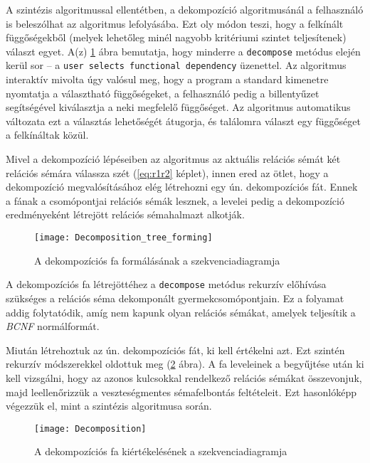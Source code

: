 A szintézis algoritmussal ellentétben, a dekompozíció algoritmusánál a felhasználó is beleszólhat az algoritmus lefolyásába. Ezt oly módon teszi, hogy a felkínált függőségekből (melyek lehetőleg minél nagyobb kritériumi szintet teljesítenek) választ egyet. A(z) \ref{fig:dectree} ábra bemutatja, hogy minderre a \lstinline{decompose} metódus elején kerül sor – a \lstinline{user selects functional dependency} üzenettel. Az algoritmus interaktív mivolta úgy valósul meg, hogy a program a standard kimenetre nyomtatja a választható függőségeket, a felhasználó pedig a billentyűzet segítségével kiválasztja a neki megfelelő függőséget. Az algoritmus automatikus változata ezt a választás lehetőségét átugorja, és találomra választ egy függőséget a felkínáltak közül.

Mivel a dekompozíció lépéseiben az algoritmus az aktuális relációs sémát két relációs sémára válassza szét (\ref{eq:r1r2} képlet), innen ered az ötlet, hogy a dekompozíció megvalósításához elég létrehozni egy ún. dekompozíciós fát. Ennek a fának a csomópontjai relációs sémák lesznek, a levelei pedig a dekompozíció eredményeként létrejött relációs sémahalmazt alkotják.

\begin{figure}
    \centering
    \texttt{[image: Decomposition\_tree\_forming]}
    \caption{A dekompozíciós fa formálásának a szekvenciadiagramja}
    \label{fig:dectree}
\end{figure}

A dekompozíciós fa létrejöttéhez a \lstinline{decompose} metódus rekurzív előhívása szükséges a relációs séma dekomponált gyermekcsomópontjain. Ez a folyamat addig folytatódik, amíg nem kapunk olyan relációs sémákat, amelyek teljesítik a \textit{BCNF} normálformát.

Miután létrehoztuk az ún. dekompozíciós fát, ki kell értékelni azt. Ezt szintén rekurzív módszerekkel oldottuk meg (\ref{fig:decomposition} ábra). A fa leveleinek a begyűjtése után ki kell vizsgálni, hogy az azonos kulcsokkal rendelkező relációs sémákat összevonjuk, majd leellenőrizzük a veszteségmentes sémafelbontás feltételeit. Ezt hasonlóképp végezzük el, mint a szintézis algoritmusa során. 

\begin{figure}
    \centering
    \texttt{[image: Decomposition]}
    \caption{A dekompozíciós fa kiértékelésének a szekvenciadiagramja}
    \label{fig:decomposition}
\end{figure}

